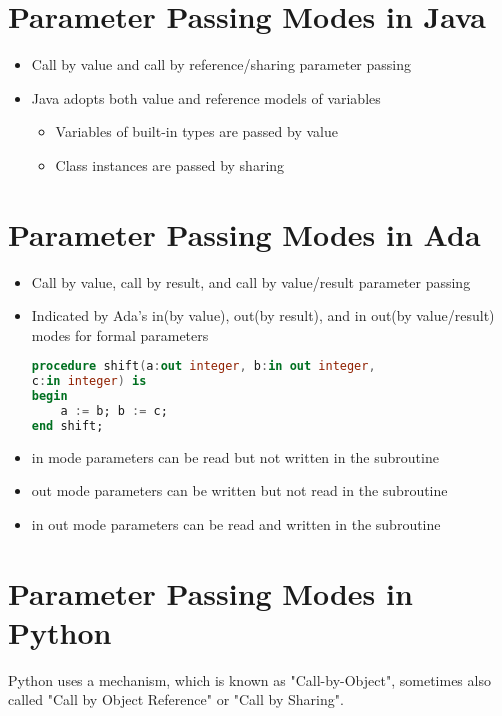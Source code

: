 \documentclass[12pt]{article}
\begin{document}
\section{Parameter Passing Modes in Java}

\begin{itemize}
	\item Call by value and call by reference/sharing parameter passing
	\item Java adopts both value and reference models of variables
	\begin{itemize}
		\item Variables of built-in types are passed by value
		\item Class instances are passed by sharing
	\end{itemize}
\end{itemize}


\newpage


\section{Parameter Passing Modes in Ada}

\begin{itemize}
	\item Call by value, call by result, and call by value/result parameter passing
	\item Indicated by Ada’s in(by value), out(by result), and in out(by value/result) modes for formal parameters
\begin{lstlisting}[language=Ada]
procedure shift(a:out integer, b:in out integer,
c:in integer) is
begin
	a := b; b := c;
end shift;
\end{lstlisting}
	\item in mode parameters can be read but not written in the subroutine
	\item out mode parameters can be written but not read in the subroutine
	\item in out mode parameters can be read and written in the subroutine
\end{itemize}


\section{Parameter Passing Modes in Python}

Python uses a mechanism, which is known as "Call-by-Object", sometimes also called "Call by Object Reference" or "Call by Sharing".
\end{document}
